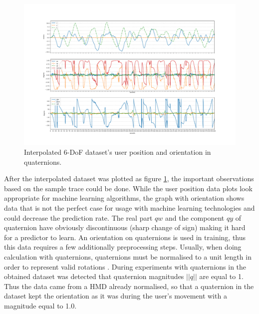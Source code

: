 \begin{figure}[htb]
	\begin{center}
		\includegraphics[width=1\textwidth, keepaspectratio]{gfx/Fig-1556-interpolated_2.pdf}
		\caption{\label{fig:inter_data}Interpolated 6-DoF dataset's user position and orientation in quaternions.}
	\end{center}
\end{figure}

After the interpolated dataset was plotted as figure \ref{fig:inter_data}, the important observations based on the sample trace could be done. While the user position data plots look appropriate for machine learning algorithms, the graph with orientation shows data that is not the perfect case for usage with machine learning technologies and could decrease the prediction rate. The real part $qw$ and the component $qy$ of quaternion have obviously discontinuous (sharp change of sign) making it hard for a predictor to learn. An orientation on quaternions is used in training, thus this data requires a few additionally preprocessing steps. Usually, when doing calculation with quaternions, quaternions must be normalised to a unit length in order to represent valid rotations \cite{principles_robot_motion_book}. During experiments with quaternions in the obtained dataset was detected that quaternion magnitudes $|| q ||$ are equal to 1. Thus the data came from a HMD already normalised, so that a quaternion in the dataset kept the orientation as it was during the user's movement with a magnitude equal to 1.0.

